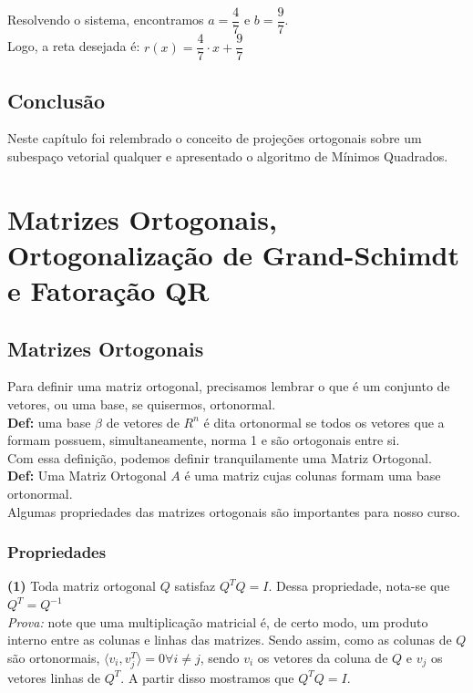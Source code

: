 \documentclass[12pt]{article}
\begin{document}
	Resolvendo o sistema, encontramos $a=\dfrac{4}{7}$ e $b=\dfrac{9}{7}$.\\
	
	Logo, a reta desejada é: $r(x)=\dfrac{4}{7}\cdot x + \dfrac{9}{7}$
	
	\subsection{Conclusão}
	Neste capítulo foi relembrado o conceito de projeções ortogonais sobre um subespaço vetorial qualquer e apresentado o algoritmo de Mínimos Quadrados.
	
	
	\section{Matrizes Ortogonais, Ortogonalização de Grand-Schimdt e Fatoração QR}
	
	\subsection{Matrizes Ortogonais}
	
	Para definir uma matriz ortogonal, precisamos lembrar o que é um conjunto de vetores, ou uma base, se quisermos, ortonormal.\\
	
	\textbf{Def:} uma base $\beta$ de vetores de $R^n$ é dita ortonormal se todos os vetores que a formam possuem, simultaneamente, norma 1 e são ortogonais entre si.\\
	
	Com essa definição, podemos definir tranquilamente uma Matriz Ortogonal.\\
	
	\textbf{Def:} Uma Matriz Ortogonal $A$ é uma matriz cujas colunas formam uma base ortonormal. \\
	
	Algumas propriedades das matrizes ortogonais são importantes para nosso curso.
	
	\subsubsection{Propriedades}
	
	\textbf{(1)} Toda matriz ortogonal $Q$ satisfaz $Q^{T}Q=I$. Dessa propriedade, nota-se que $Q^T=Q^{-1}$\\
	
	\textit{Prova:} note que uma multiplicação matricial é, de certo modo, um produto interno entre as colunas e linhas das matrizes. Sendo assim, como as colunas de $Q$ são ortonormais, $\langle v_i,v^{T}_{j} \rangle=0 \forall i\neq j$, sendo $v_i$ os vetores da coluna de $Q$ e $v_j$ os vetores linhas de $Q^T$. A partir disso mostramos que $Q^TQ=I$.  \\
	
\end{document}
